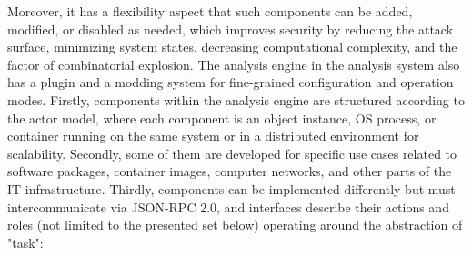 Moreover, it has a flexibility aspect that such components can be added, modified, or disabled as needed, which improves security by reducing the attack surface, minimizing system states, decreasing computational complexity, and the factor of combinatorial explosion. The analysis engine in the analysis system also has a plugin and a modding system for fine-grained configuration and operation modes. Firstly, components within the analysis engine are structured according to the actor model, where each component is an object instance, OS process, or container running on the same system or in a distributed environment for scalability. Secondly, some of them are developed for specific use cases related to software packages, container images, computer networks, and other parts of the IT infrastructure. Thirdly, components can be implemented differently but must intercommunicate via JSON-RPC 2.0, and interfaces describe their actions and roles (not limited to the presented set below) operating around the abstraction of "task":
